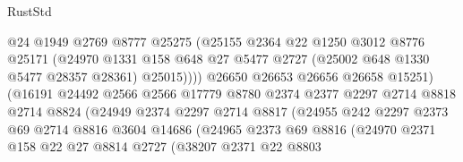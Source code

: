 \begin{lexlean}{RustStd}
\begin{coremodule}
                                @24
                                @1949
                                @2769
                                @8777
                                @25275
                                (@25155
                                  @2364
                                  @22
                                  @1250
                                  @3012
                                  @8776
                                  @25171
                                  (@24970
                                    @1331
                                    @158
                                    @648
                                    @27
                                    @5477
                                    @2727
                                    (@25002 @648 @1330 @5477 @28357 @28361)
                                    @25015))))
                            @26650
                            @26653
                            @26656
                            @26658
                            @15251)
                          (@16191
                            @24492
                            @2566
                            @2566
                            @17779
                            @8780
                            @2374
                            @2377
                            @2297
                            @2714
                            @8818
                            @2714
                            @8824
                            (@24949
                              @2374
                              @2297
                              @2714
                              @8817
                              (@24955
                                @242
                                @2297
                                @2373
                                @69
                                @2714
                                @8816
                                @3604
                                @14686
                                (@24965
                                  @2373
                                  @69
                                  @8816
                                  (@24970
                                    @2371
                                    @158
                                    @22
                                    @27
                                    @8814
                                    @2727
                                    (@38207
                                      @2371
                                      @22
                                      @8803

\end{coremodule}
\end{lexlean}
